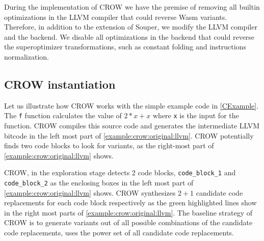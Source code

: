 During the implementation of CROW we have the premise of removing all builtin optimizations in the LLVM compiler that could reverse Wasm variants.
Therefore, in addition to the extension of Souper, we modify the LLVM compiler and the \wasm backend.
We disable all optimizations in the \wasm backend that could reverse the superoptimizer transformations, such as constant folding and instructions normalization.



\subsection*{CROW instantiation}

Let us illustrate how CROW works with the simple example code in \autoref{CExample}. The \texttt{f} function calculates the value of $2 * x + x$ where \texttt{x} is the input for the function.  CROW compiles this source code and generates the intermediate LLVM bitcode in the left most part of \autoref{example:crow:original:llvm}. CROW potentially finds two code blocks to look for variants, as the right-most part of \autoref{example:crow:original:llvm} shows.


    

CROW, in the exploration stage detects 2 code blocks, \texttt{code\_block\_1} and \texttt{code\_block\_2} as the enclosing boxes in the left most part of \autoref{example:crow:original:llvm} shows. CROW synthesizes $2 + 1$ candidate code replacements for each code block respectively as the green highlighted lines show in the right most parts of \autoref{example:crow:original:llvm}.
The baseline strategy of CROW is to generate variants out of all possible combinations of the candidate code replacements, \ie uses the power set of all candidate code replacements.

